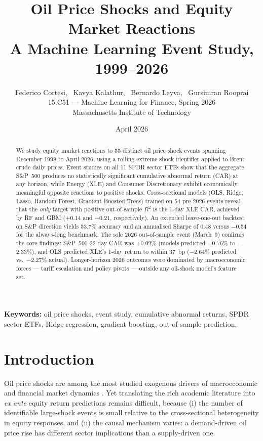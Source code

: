 \documentclass[11pt,a4paper]{article}
\title{\textbf{Oil Price Shocks and Equity Market Reactions}\\
\large A Machine Learning Event Study, 1999--2026}
\author{Federico Cortesi, \ Kavya Kalathur, \ Bernardo Leyva, \ Gursimran Rooprai \\[4pt]
\small 15.C51 — Machine Learning for Finance, Spring 2026\\
\small Massachusetts Institute of Technology}
\date{April 2026}
\begin{document}
\maketitle
\thispagestyle{empty}

\begin{abstract}
\noindent
We study equity market reactions to 55 distinct oil price shock events spanning December 1998 to April 2026, using a rolling-extreme shock identifier applied to Brent crude daily prices. Event studies on all 11 SPDR sector ETFs show that the aggregate S\&P~500 produces no statistically significant cumulative abnormal return (CAR) at any horizon, while Energy (XLE) and Consumer Discretionary exhibit economically meaningful opposite reactions to positive shocks. Cross-sectional models (OLS, Ridge, Lasso, Random Forest, Gradient Boosted Trees) trained on 54 pre-2026 events reveal that the \emph{only} target with positive out-of-sample $R^2$ is the 1-day XLE CAR, achieved by RF and GBM (+0.14 and +0.21, respectively). An extended leave-one-out backtest on S\&P direction yields 53.7\% accuracy and an annualised Sharpe of 0.48 versus $-$0.54 for the always-long benchmark. The sole 2026 out-of-sample event (March~9) confirms the core findings: S\&P~500 22-day CAR was $+$0.02\% (models predicted $-$0.76\% to $-$2.33\%), and OLS predicted XLE's 1-day return to within 37~bp ($-$2.64\% predicted vs.\ $-$2.27\% actual). Longer-horizon 2026 outcomes were dominated by macroeconomic forces — tariff escalation and policy pivots — outside any oil-shock model's feature set.
\end{abstract}

\bigskip
\noindent\textbf{Keywords:} oil price shocks, event study, cumulative abnormal returns, SPDR sector ETFs, Ridge regression, gradient boosting, out-of-sample prediction.

\vspace{1em}

\section{Introduction}

Oil price shocks are among the most studied exogenous drivers of macroeconomic and financial market dynamics \cite{hamilton1983, kilian2009}. Yet translating the rich academic literature into \emph{ex ante} equity return predictions remains difficult, because (i) the number of identifiable large-shock events is small relative to the cross-sectional heterogeneity in equity responses, and (ii) the causal mechanism varies: a demand-driven oil price rise has different sector implications than a supply-driven one.
\end{document}
